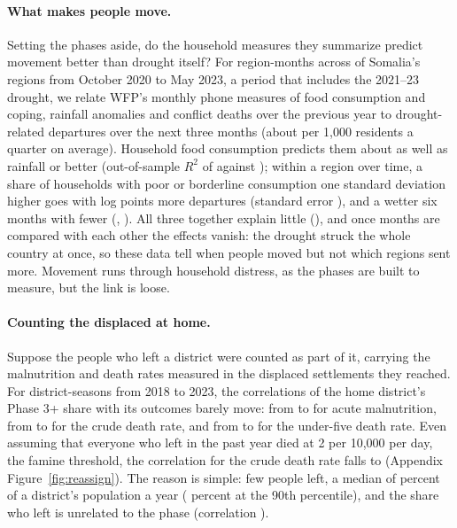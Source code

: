 \documentclass[11pt]{article}
\begin{document}
\paragraph{What makes people move.} Setting the phases aside, do the household measures they summarize predict movement better than drought itself? For \dpBN{} region-months across \dpBRegions{} of Somalia's regions from October 2020 to May 2023, a period that includes the 2021--23 drought, we relate WFP's monthly phone measures of food consumption and coping, rainfall anomalies and conflict deaths over the previous year to drought-related departures over the next three months (about \dpBMean{} per 1,000 residents a quarter on average). Household food consumption predicts them about as well as rainfall or better (out-of-sample $R^2$ of \dpBDrHh{} against \dpBDrRain{}); within a region over time, a share of households with poor or borderline consumption one standard deviation higher goes with \dpBWFcs{} log points more departures (standard error \dpBWFcsSe{}), and a wetter six months with fewer (\dpBWRain{}, \dpBWRainSe{}). All three together explain little (\dpBDrAll{}), and once months are compared with each other the effects vanish: the drought struck the whole country at once, so these data tell when people moved but not which regions sent more. Movement runs through household distress, as the phases are built to measure, but the link is loose.

\paragraph{Counting the displaced at home.} Suppose the people who left a district were counted as part of it, carrying the malnutrition and death rates measured in the displaced settlements they reached. For \dpCN{} district-seasons from 2018 to 2023, the correlations of the home district's Phase 3+ share with its outcomes barely move: from \dpCStayGam{} to \dpCAllGamTwelve{} for acute malnutrition, from \dpCStayCdr{} to \dpCAllCdrTwelve{} for the crude death rate, and from \dpCStayUfive{} to \dpCAllUfiveTwelve{} for the under-five death rate. Even assuming that everyone who left in the past year died at 2 per 10,000 per day, the famine threshold, the correlation for the crude death rate falls to \dpCStressTwo{} (Appendix Figure~\ref{fig:reassign}). The reason is simple: few people left, a median of \dpCLeftMedTwelve{} percent of a district's population a year (\dpCLeftNinetyTwelve{} percent at the 90th percentile), and the share who left is unrelated to the phase (correlation \dpCLeftCorr{}).
\end{document}
